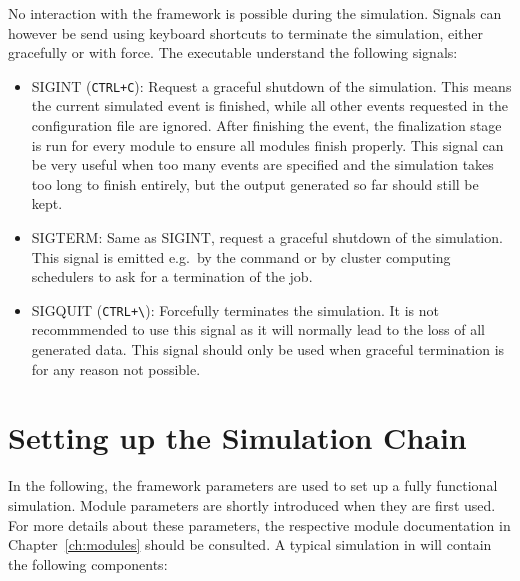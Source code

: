 \begin{itemize}
No interaction with the framework is possible during the simulation. Signals can however be send using keyboard shortcuts to terminate the simulation, either gracefully or with force. The executable understand the following signals:
\begin{itemize}
    \item SIGINT (\texttt{CTRL+C}): Request a graceful shutdown of the simulation. This means the current simulated event is finished, while all other events requested in the configuration file are ignored. After finishing the event, the finalization stage is run for every module to ensure all modules finish properly. This signal can be very useful when too many events are specified and the simulation takes too long to finish entirely, but the output generated so far should still be kept.
    \item SIGTERM: Same as SIGINT, request a graceful shutdown of the simulation. This signal is emitted e.g.\ by the  command or by cluster computing schedulers to ask for a termination of the job.
    \item SIGQUIT (\texttt{CTRL+\textbackslash}): Forcefully terminates the simulation. It is not recommmended to use this signal as it will normally lead to the loss of all generated data. This signal should only be used when graceful termination is for any reason not possible.
\end{itemize}


\section{Setting up the Simulation Chain}
\label{sec:setting_up_simulation_chain}

In the following, the framework parameters are used to set up a fully functional simulation.
Module parameters are shortly introduced when they are first used.
For more details about these parameters, the respective module documentation in Chapter~\ref{ch:modules} should be consulted.
A typical simulation in \apsq will contain the following components:
\begin{itemize}


\end{itemize}
\end{itemize}
